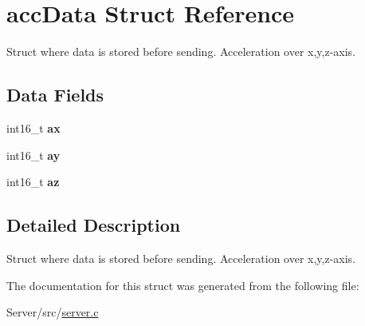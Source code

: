 \hypertarget{structaccData}{}\section{acc\+Data Struct Reference}
\label{structaccData}


Struct where data is stored before sending. Acceleration over x,y,z-\/axis.  


\subsection*{Data Fields}
\begin{DoxyCompactItemize}
\item 
int16\+\_\+t {\bfseries ax}\hypertarget{structaccData_a928b9b55ffd27c3fb29192daa5ec6f73}{}\label{structaccData_a928b9b55ffd27c3fb29192daa5ec6f73}

\item 
int16\+\_\+t {\bfseries ay}\hypertarget{structaccData_ac9e740aa592519f3fa209747d350976e}{}\label{structaccData_ac9e740aa592519f3fa209747d350976e}

\item 
int16\+\_\+t {\bfseries az}\hypertarget{structaccData_ab2e3b7364a771a80e8484b0d4fe9ab05}{}\label{structaccData_ab2e3b7364a771a80e8484b0d4fe9ab05}

\end{DoxyCompactItemize}


\subsection{Detailed Description}
Struct where data is stored before sending. Acceleration over x,y,z-\/axis. 

The documentation for this struct was generated from the following file\+:\begin{DoxyCompactItemize}
\item 
Server/src/\hyperlink{server_8c}{server.\+c}\end{DoxyCompactItemize}
